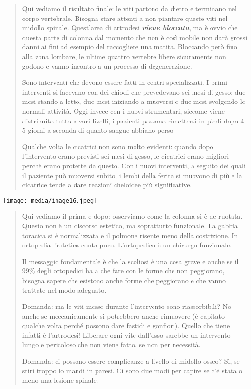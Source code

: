 \documentclass[]{article}
\begin{document}
\begin{quote}
Qui vediamo il risultato finale: le viti partono da dietro e terminano
nel corpo vertebrale. Bisogna stare attenti a non piantare queste viti
nel midollo spinale. Quest'area di artrodesi \textbf{\emph{viene
bloccata}}, ma è ovvio che questa parte di colonna dal momento che non è
così mobile non darà grossi danni ai fini ad esempio del raccogliere una
matita. Bloccando però fino alla zona lombare, le ultime quattro
vertebre libere sicuramente non godono e vanno incontro a un processo di
degenerazione.

Sono interventi che devono essere fatti in centri specializzati. I primi
interventi si facevano con dei chiodi che prevedevano sei mesi di gesso:
due mesi stando a letto, due mesi iniziando a muoversi e due mesi
svolgendo le normali attività. Oggi invece con i nuovi strumentari,
siccome viene distribuito tutto a vari livelli, i pazienti possono
rimettersi in piedi dopo 4-5 giorni a seconda di quanto sangue abbiano
perso.

Qualche volta le cicatrici non sono molto evidenti: quando dopo
l'intervento erano previsti sei mesi di gesso, le cicatrici erano
migliori perché erano protette da questo. Con i nuovi interventi, a
seguito dei quali il paziente può muoversi subito, i lembi della ferita
si muovono di più e la cicatrice tende a dare reazioni cheloidee più
significative.
\end{quote}

\texttt{[image: media/image16.jpeg]}

\begin{quote}
Qui vediamo il prima e dopo: osserviamo come la colonna si è de-ruotata.
Questo non è un discorso estetico, ma soprattutto funzionale. La gabbia
toracica si è normalizzata e il polmone risente meno della costrizione.
In ortopedia l'estetica conta poco. L'ortopedico è un chirurgo
funzionale.

Il messaggio fondamentale è che la scoliosi è una cosa grave e anche se
il 99\% degli ortopedici ha a che fare con le forme che non peggiorano,
bisogna sapere che esistono anche forme che peggiorano e che vanno
trattate nel modo adeguato.

Domanda: ma le viti messe durante l'intervento sono riassorbibili? No,
anche se meccanicamente si potrebbero anche rimuovere (è capitato
qualche volta perché possono dare fastidi e gonfiori). Quello che tiene
infatti è l'artrodesi! Liberare ogni vite dall'osso sarebbe un
intervento lungo e pericoloso che non viene fatto, se non per necessità.

Domanda: ci possono essere complicanze a livello di midollo osseo? Sì,
se stiri troppo lo mandi in paresi. Ci sono due modi per capire se c'è
stata o meno una lesione spinale:
\end{quote}
\end{document}

